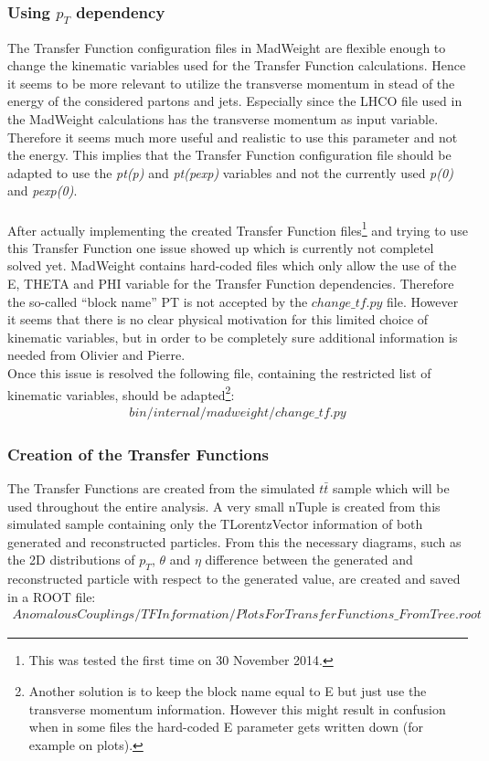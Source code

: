 \subsubsection{Using $p_{T}$ dependency} \label{subsubsec::PtDependency}
The Transfer Function configuration files in MadWeight are flexible enough to change the kinematic variables used for the Transfer Function calculations. Hence it seems to be more relevant to utilize the transverse momentum in stead of the energy of the considered partons and jets. Especially since the LHCO file used in the MadWeight calculations has the transverse momentum as input variable. Therefore it seems much more useful and realistic to use this parameter and not the energy. This implies that the Transfer Function configuration file should be adapted to use the \textit{pt(p)} and \textit{pt(pexp)} variables and not the currently used \textit{p(0)} and \textit{pexp(0)}.\\
\\
After actually implementing the created Transfer Function files\footnote{This was tested the first time on 30 November 2014.} and trying to use this Transfer Function one issue showed up which is currently not completel solved yet. MadWeight contains hard-coded files which only allow the use of the E, THETA and PHI variable for the Transfer Function dependencies. Therefore the so-called ``block name'' PT is not accepted by the $change\_tf.py$ file. However it seems that there is no clear physical motivation for this limited choice of kinematic variables, but in order to be completely sure additional information is needed from Olivier and Pierre.\\
Once this issue is resolved the following file, containing the restricted list of kinematic variables, should be adapted\footnote{Another solution is to keep the block name equal to E but just use the transverse momentum information. However this might result in confusion when in some files the hard-coded E parameter gets written down (for example on plots).}:
\begin{eqnarray*}
 bin/internal/madweight/change\_tf.py
\end{eqnarray*}

\subsubsection{Creation of the Transfer Functions}
The Transfer Functions are created from the simulated $t\bar{t}$ sample which will be used throughout the entire analysis. A very small nTuple is created from this simulated sample containing only the TLorentzVector information of both generated and reconstructed particles. From this the necessary diagrams, such as the 2D distributions of $p_T$, $\theta$ and $\eta$ difference between the generated and reconstructed particle with respect to the generated value, are created and saved in a ROOT file:
\begin{eqnarray*}
 AnomalousCouplings/TFInformation/PlotsForTransferFunctions\_FromTree.root 
\end{eqnarray*}


